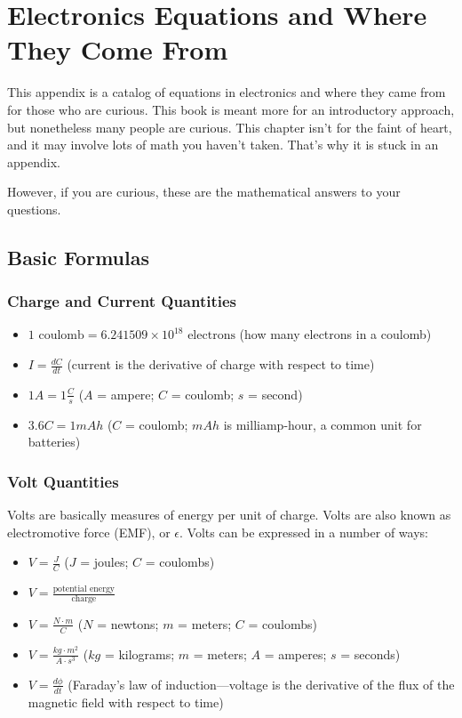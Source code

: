 \chapter{Electronics Equations and Where They Come From}
\label{appendixElectronicsEquations}


This appendix is a catalog of equations in electronics and where they came from for those who are curious.
This book is meant more for an introductory approach, but nonetheless many people are curious.
This chapter isn't for the faint of heart, and it may involve lots of math you haven't taken.
That's why it is stuck in an appendix.

However, if you are curious, these are the mathematical answers to your questions.

\section{Basic Formulas}

\subsection{Charge and Current Quantities}

\begin{itemize}
\item $1\textrm{ coulomb}  = 6.241509×10^18\textrm{ electrons}$ (how many electrons in a coulomb)
\item $I = \frac{dC}{dt}$ (current is the derivative of charge with respect to time)
\item $1A = 1\frac{C}{s}$ ($A$ = ampere; $C$ = coulomb; $s$ = second)
\item $3.6C = 1 mAh$ ($C$ = coulomb; $mAh$ is milliamp-hour,  a common unit for batteries)
\end{itemize}

\subsection{Volt Quantities}

Volts are basically measures of energy per unit of charge. Volts are also known as electromotive force (EMF), or $\epsilon$.  Volts can be expressed in a number of ways:

\begin{itemize}
\item $V = \frac{J}{C}$ ($J$ = joules; $C$ = coulombs)
\item $V = \frac{\textrm{potential energy}}{\textrm{charge}}$
\item $V = \frac{N\cdot m}{C}$ ($N$ = newtons; $m$ = meters; $C$ = coulombs)
\item $V = \frac{kg\cdot m^2}{A\cdot s^3}$ ($kg$ = kilograms; $m$ = meters; $A$ = amperes; $s$ = seconds)
\item $V = \frac{d\phi}{dt}$ (Faraday's law of induction---voltage is the derivative of the flux of the magnetic field with respect to time)
\end{itemize}


